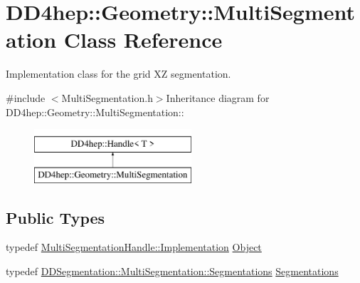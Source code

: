 \hypertarget{class_d_d4hep_1_1_geometry_1_1_multi_segmentation}{
\section{DD4hep::Geometry::MultiSegmentation Class Reference}
\label{class_d_d4hep_1_1_geometry_1_1_multi_segmentation}
}


Implementation class for the grid XZ segmentation.  


{\ttfamily \#include $<$MultiSegmentation.h$>$}Inheritance diagram for DD4hep::Geometry::MultiSegmentation::\begin{figure}[H]
\begin{center}
\leavevmode
\includegraphics[height=2cm]{class_d_d4hep_1_1_geometry_1_1_multi_segmentation}
\end{center}
\end{figure}
\subsection*{Public Types}
\begin{DoxyCompactItemize}
\item 
typedef \hyperlink{class_t}{MultiSegmentationHandle::Implementation} \hyperlink{class_d_d4hep_1_1_geometry_1_1_multi_segmentation_ab30207d7b5e4366c7227de5743a88452}{Object}
\item 
typedef \hyperlink{class_d_d4hep_1_1_d_d_segmentation_1_1_multi_segmentation_a083ba7cc081c5c3c47cafac5980100f8}{DDSegmentation::MultiSegmentation::Segmentations} \hyperlink{class_d_d4hep_1_1_geometry_1_1_multi_segmentation_ae2c7165290144f20af27248eab1858c5}{Segmentations}
\end{DoxyCompactItemize}
